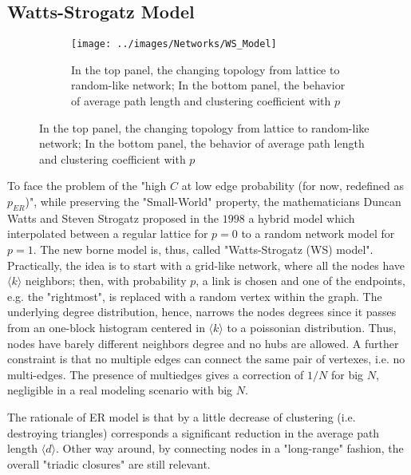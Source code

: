 \documentclass[a4paper,12pt,twoside]{book} %
\theoremstyle{definition}
\begin{document}
\subsection{Watts-Strogatz Model}
\label{sec:WS_Model}
\begin{figure}[ht]
    \begin{subfigure}{\textwidth}
        \texttt{[image: ../images/Networks/WS\_Model]}
        \centering
        \caption{In the top panel, the changing topology from lattice to random-like network; In the bottom panel, the behavior of average path length and clustering coefficient with $p$ \cite{Olaf:2011_NonRandomBrain}}
        \label{fig:WSmodel}
    \end{subfigure}
\end{figure}

To face the problem of the "high $C$ at low edge probability (for now, redefined as $p_{ER}$)", while preserving the "Small-World" property, the mathematicians Duncan Watts and Steven Strogatz proposed in the $1998$ a hybrid model which interpolated between a regular lattice for $p = 0$ to a random network model for $p = 1$. The new borne model is, thus, called "Watts-Strogatz (WS) model".
Practically, the idea is to start with a grid-like network, where all the nodes have $\langle k \rangle$ neighbors; then, with probability $p$, a link is chosen and one of the endpoints, e.g. the "rightmost", is replaced with a random vertex within the graph. The underlying degree distribution, hence, narrows the nodes degrees since it passes from an one-block histogram centered in $\langle k \rangle$ to a poissonian distribution. Thus, nodes have barely different neighbors degree and no hubs are allowed.
A further constraint is that no multiple edges can connect the same pair of vertexes, i.e. no multi-edges. The presence of multiedges gives a correction of $1/N$ for big $N$, negligible in a real modeling scenario with big $N$.

The rationale of ER model is that by a little decrease of clustering (i.e. destroying triangles) corresponds a significant reduction in the average path length $\langle d \rangle$. Other way around, by connecting nodes in a "long-range" fashion, the overall "triadic closures" are still relevant. 
\end{document}
